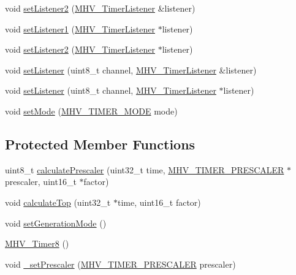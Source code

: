 \begin{DoxyCompactItemize}
\item 
void \hyperlink{class_m_h_v___timer8_a4f2de1b24428ba53f0a6b26555ec4c7b}{set\-Listener2} (\hyperlink{class_m_h_v___timer_listener}{\-M\-H\-V\-\_\-\-Timer\-Listener} \&listener)
\item 
void \hyperlink{class_m_h_v___timer8_a78e53f842413e37b52c24c5f774ecfc0}{set\-Listener1} (\hyperlink{class_m_h_v___timer_listener}{\-M\-H\-V\-\_\-\-Timer\-Listener} $\ast$listener)
\item 
void \hyperlink{class_m_h_v___timer8_ae0bd4c33cd0b6bb3cd345ceb7cbe3d71}{set\-Listener2} (\hyperlink{class_m_h_v___timer_listener}{\-M\-H\-V\-\_\-\-Timer\-Listener} $\ast$listener)
\item 
void \hyperlink{class_m_h_v___timer8_ad4123058efb7779e2103816ead251326}{set\-Listener} (uint8\-\_\-t channel, \hyperlink{class_m_h_v___timer_listener}{\-M\-H\-V\-\_\-\-Timer\-Listener} \&listener)
\item 
void \hyperlink{class_m_h_v___timer8_af5b356d46f9cb39b7fe9352214557d95}{set\-Listener} (uint8\-\_\-t channel, \hyperlink{class_m_h_v___timer_listener}{\-M\-H\-V\-\_\-\-Timer\-Listener} $\ast$listener)
\item 
void \hyperlink{class_m_h_v___timer8_ad18f37f37ce07f2d39b8f3cac4b2fb82}{set\-Mode} (\hyperlink{_m_h_v___timer8_8h_ae9de6a07a79f63ce9eeb6ba2bc9b053d}{\-M\-H\-V\-\_\-\-T\-I\-M\-E\-R\-\_\-\-M\-O\-D\-E} mode)
\end{DoxyCompactItemize}
\subsection*{\-Protected \-Member \-Functions}
\begin{DoxyCompactItemize}
\item 
uint8\-\_\-t \hyperlink{class_m_h_v___timer8_a044d91ee04cc07dad098be8010f94463}{calculate\-Prescaler} (uint32\-\_\-t time, \hyperlink{_m_h_v___timer8_8h_a2e7ef9dbc200586bf55b0003896de599}{\-M\-H\-V\-\_\-\-T\-I\-M\-E\-R\-\_\-\-P\-R\-E\-S\-C\-A\-L\-E\-R} $\ast$prescaler, uint16\-\_\-t $\ast$factor)
\item 
void \hyperlink{class_m_h_v___timer8_a8f1a062c5b11ccc6d644576d127ca4ca}{calculate\-Top} (uint32\-\_\-t $\ast$time, uint16\-\_\-t factor)
\item 
void \hyperlink{class_m_h_v___timer8_a5f8f53c9fc73fed26424c6a6904fdfe6}{set\-Generation\-Mode} ()
\item 
\hyperlink{class_m_h_v___timer8_a2df9d6ab1036772eeea2037f6ad68ab0}{\-M\-H\-V\-\_\-\-Timer8} ()
\item 
void \hyperlink{class_m_h_v___timer8_a45bec0afb3006126f53066365a8558f6}{\-\_\-set\-Prescaler} (\hyperlink{_m_h_v___timer8_8h_a2e7ef9dbc200586bf55b0003896de599}{\-M\-H\-V\-\_\-\-T\-I\-M\-E\-R\-\_\-\-P\-R\-E\-S\-C\-A\-L\-E\-R} prescaler)
\end{DoxyCompactItemize}
